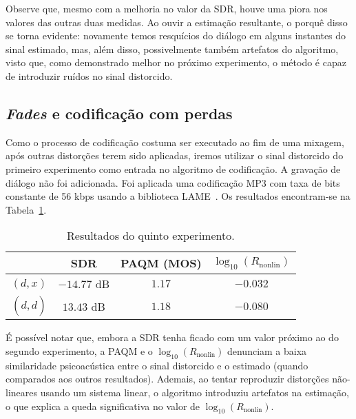 Observe que, mesmo com a melhoria no valor da SDR, houve uma piora nos valores das
outras duas medidas. Ao ouvir a estimação resultante, o porquê disso se torna evidente:
novamente temos resquícios do diálogo em alguns instantes do sinal estimado, mas, além
disso, possivelmente também artefatos do algoritmo, visto que, como demonstrado melhor
no próximo experimento, o método é capaz de introduzir ruídos no sinal distorcido.

\subsection{\textit{Fades} e codificação com perdas} \label{subsec:wiener:experiment-5}

Como o processo de codificação costuma ser executado ao fim de uma mixagem, após outras
distorções terem sido aplicadas, iremos utilizar o sinal distorcido do primeiro
experimento como entrada no algoritmo de codificação. A gravação de diálogo não foi
adicionada. Foi aplicada uma codificação MP3 com taxa de bits constante de 56 kbps
usando a biblioteca LAME~\cite{lame-encoder}. Os resultados encontram-se na
Tabela~\ref{tab:wf:experiment-5}. {\def\arraystretch{1.25}\tabcolsep=10pt
\begin{table}[!ht]
	\centering
	\caption[Resultados do quinto experimento: \textit{fades} e codificação com perdas]{Resultados do quinto experimento.}
	\label{tab:wf:experiment-5}
	\begin{tabular}{cccc}
		\toprule
		               & SDR         & PAQM (MOS) & $\log_{10}(R_{\text{nonlin}})$ \\
		\midrule
		$(d, x)$       & $-14.77$ dB & $1.17$     & $-0.032$                       \\
		$(d, \hat{d})$ & $13.43$ dB  & $1.18$     & $-0.080$                       \\ \bottomrule
	\end{tabular}
\end{table}
}

É possível notar que, embora a SDR tenha ficado com um valor próximo ao do segundo experimento, a PAQM e o $\log_{10}(R_{\text{nonlin}})$ denunciam a baixa similaridade psicoacústica entre o sinal distorcido e o estimado (quando comparados aos outros resultados). Ademais, ao tentar reproduzir distorções não-lineares usando um sistema linear, o algoritmo introduziu artefatos na estimação, o que explica a queda significativa no valor de $\log_{10}(R_{\text{nonlin}})$.

